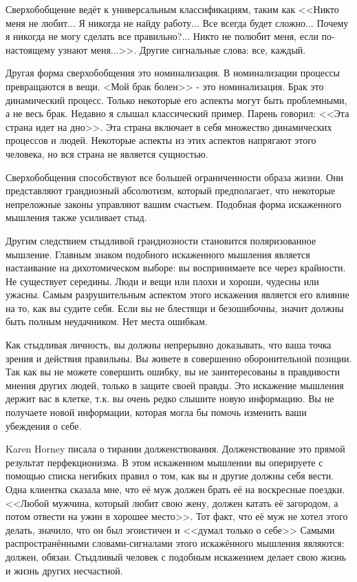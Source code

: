 \documentclass[10pt, fleqn]{article}
\begin{document}
Сверхобобщение ведёт к универсальным классификациям, таким как <<Никто меня не любит... Я никогда не найду работу... Все всегда будет сложно... Почему я никогда не могу сделать все правильно?... Никто не полюбит меня, если по-настоящему узнают меня...>>. Другие сигнальные слова: все, каждый.

Другая форма сверхобобщения это номинализация. В номинализации процессы превращаются в вещи. <Мой брак болен>> - это номинализация. Брак это динамический процесс. Только некоторые его аспекты могут быть проблемными, а не весь брак. Недавно я слышал классический пример. Парень говорил: <<Эта страна идет на дно>>. Эта страна включает в себя множество динамических процессов и людей. Некоторые аспекты из этих аспектов напрягают этого человека, но вся страна не является сущностью.

Сверхобобщения способствуют все большей ограниченности образа жизни. Они представляют грандиозный абсолютизм, который предполагает, что некоторые непреложные законы управляют вашим счастьем. Подобная форма искаженного мышления также усиливает стыд.


Другим следствием стыдливой грандиозности становится поляризованное мышление. Главным знаком подобного искаженного мышления является настаивание на дихотомическом выборе: вы воспринимаете все через крайности. Не существует середины. Люди и вещи или плохи и хороши, чудесны или ужасны. Самым разрушительным аспектом этого искажения является его влияние на то, как вы судите себя. Если вы не блестящи и безошибочны, значит должны быть полным неудачником. Нет места ошибкам.


Как стыдливая личность, вы должны непрерывно доказывать, что ваша точка зрения и действия правильны. Вы живете в совершенно оборонительной позиции. Так как вы не можете совершить ошибку, вы не заинтересованы в правдивости мнения других людей, только в защите своей правды. Это искажение мышления держит вас в клетке, т.к. вы очень редко слышите новую информацию. Вы не получаете новой информации, которая могла бы помочь изменить ваши убеждения о себе.


Karen Horney писала о тирании долженствования. Долженствование это прямой результат перфекционизма. В этом искаженном мышлении вы оперируете с помощью списка негибких правил о том, как вы и другие должны себя вести. Одна клиентка сказала мне, что её муж должен брать её на воскресные поездки. <<Любой мужчина, который любит свою жену, должен катать её загородом, а потом отвести на ужин в хорошее место>>. Тот факт, что её муж не хотел этого делать, значило, что он был эгоистичен и <<думал только о себе>> Самыми распространёнными словами-сигналами этого искажённого мышления являются: должен, обязан. Стыдливый человек с подобным искажением делает свою жизнь и жизнь других несчастной.
\end{document}
